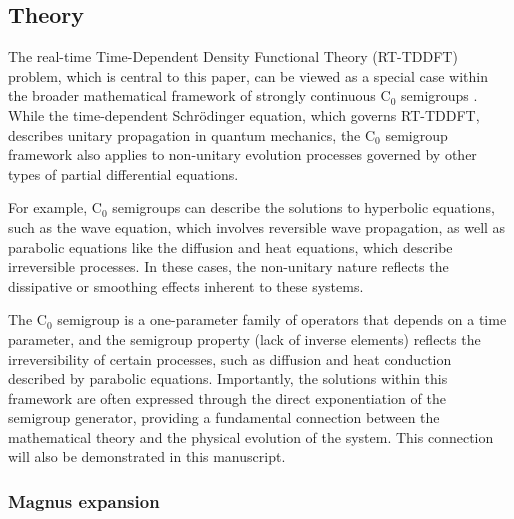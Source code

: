 \documentclass[journal=jctcce,manuscript=article,etalmode=truncate,maxauthors=10,layout=twocolumn,9pt]{achemso}   %
\begin{document}
\subsection{Theory } %
\label{sec:theory}

The real-time Time-Dependent Density Functional Theory (RT-TDDFT) problem, which is central to this paper, can be viewed as a special case within the broader mathematical framework of strongly continuous C$_0$ semigroups \cite{semigroups}. While the time-dependent Schr\"odinger equation, which governs RT-TDDFT, describes unitary propagation in quantum mechanics, the C$_0$  semigroup framework also applies to non-unitary evolution processes governed by other types of partial differential equations.

For example, C$_0$  semigroups can describe the solutions to hyperbolic equations, such as the wave equation, which involves reversible wave propagation, as well as parabolic equations like the diffusion and heat equations, which describe irreversible processes. In these cases, the non-unitary nature reflects the dissipative or smoothing effects inherent to these systems.

The C$_0$ semigroup is a one-parameter family of operators that depends on a time parameter, and the semigroup property (lack of inverse elements) reflects the irreversibility of certain processes, such as diffusion and heat conduction described by parabolic equations. Importantly, the solutions within this framework are often expressed through the direct exponentiation of the semigroup generator, providing a fundamental connection between the mathematical theory and the physical evolution of the system. This connection will also be demonstrated in this manuscript.

\subsubsection{Magnus expansion} 
\end{document}
